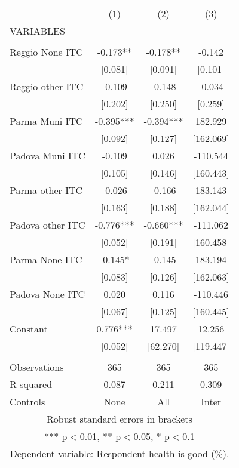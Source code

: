 \begin{tabular}{lccc} \hline
 & (1) & (2) & (3) \\
VARIABLES &  &  &  \\ \hline
 &  &  &  \\
Reggio None ITC & -0.173** & -0.178** & -0.142 \\
 & [0.081] & [0.091] & [0.101] \\
Reggio other ITC & -0.109 & -0.148 & -0.034 \\
 & [0.202] & [0.250] & [0.259] \\
Parma Muni ITC & -0.395*** & -0.394*** & 182.929 \\
 & [0.092] & [0.127] & [162.069] \\
Padova Muni ITC & -0.109 & 0.026 & -110.544 \\
 & [0.105] & [0.146] & [160.443] \\
Parma other ITC & -0.026 & -0.166 & 183.143 \\
 & [0.163] & [0.188] & [162.044] \\
Padova other ITC & -0.776*** & -0.660*** & -111.062 \\
 & [0.052] & [0.191] & [160.458] \\
Parma None ITC & -0.145* & -0.145 & 183.194 \\
 & [0.083] & [0.126] & [162.063] \\
Padova None ITC & 0.020 & 0.116 & -110.446 \\
 & [0.067] & [0.125] & [160.445] \\
Constant & 0.776*** & 17.497 & 12.256 \\
 & [0.052] & [62.270] & [119.447] \\
 &  &  &  \\
Observations & 365 & 365 & 365 \\
R-squared & 0.087 & 0.211 & 0.309 \\
 Controls & None & All & Inter \\ \hline
\multicolumn{4}{c}{ Robust standard errors in brackets} \\
\multicolumn{4}{c}{ *** p$<$0.01, ** p$<$0.05, * p$<$0.1} \\
\multicolumn{4}{c}{ Dependent variable: Respondent health is good (\%).} \\
\end{tabular}
